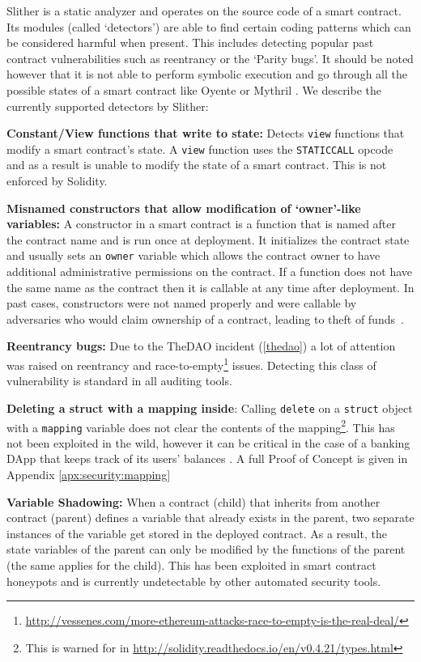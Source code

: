 Slither is a static analyzer and operates on the source code of a smart contract. Its modules (called `detectors') are able to find certain coding patterns which can be considered harmful when present. This includes detecting popular past contract vulnerabilities such as reentrancy or the `Parity bugs'. It should be noted however that it is not able to perform symbolic execution and go through all the possible states of a smart contract like Oyente or Mythril \cite{Luu:2016:MSC:2976749.2978309,mythril}. We describe the currently supported detectors by Slither:

\textbf{Constant/View functions that write to state:} Detects \texttt{view} functions that modify a smart contract's state. A \texttt{view} function uses the \texttt{STATICCALL} opcode and as a result is unable to modify the state of a smart contract\cite{staticcall}. This is not enforced by Solidity.

\textbf{Misnamed constructors that allow modification of `owner'-like variables:} A constructor in a smart contract is a function that is named after the contract name and is run once at deployment. It initializes the contract state and usually sets an \texttt{owner} variable which allows the contract owner to have additional administrative permissions on the contract. If a function does not have the same name as the contract then it is callable at any time after deployment. In past cases, constructors were not named properly and were callable by adversaries who would claim ownership of a contract, leading to theft of funds~\cite{Atzei:2017:SAE:3080353.3080363}.

\textbf{Reentrancy bugs:} Due to the TheDAO incident (\ref{thedao}) a lot of attention was raised on reentrancy and race-to-empty\footnote{\url{http://vessenes.com/more-ethereum-attacks-race-to-empty-is-the-real-deal/}} issues. Detecting this class of vulnerability is standard in all auditing tools.

\textbf{Deleting a struct with a mapping inside}: Calling \texttt{delete} on a \texttt{struct} object with a \texttt{mapping} variable does not clear the contents of the mapping\footnote{This is warned for in \url{http://solidity.readthedocs.io/en/v0.4.21/types.html}}. This has not been exploited in the wild, however it can be critical in the case of a banking DApp that keeps track of its users' balances . A full Proof of Concept is given in Appendix \ref{apx:security:mapping}

\textbf{Variable Shadowing:} When a contract (child) that inherits from another contract (parent) defines a variable that already exists in the parent, two separate instances of the variable get stored in the deployed contract. As a result, the state variables of the parent can only be modified by the functions of the parent (the same applies for the child). This has been exploited in smart contract honeypots and is currently undetectable by other automated security tools.

